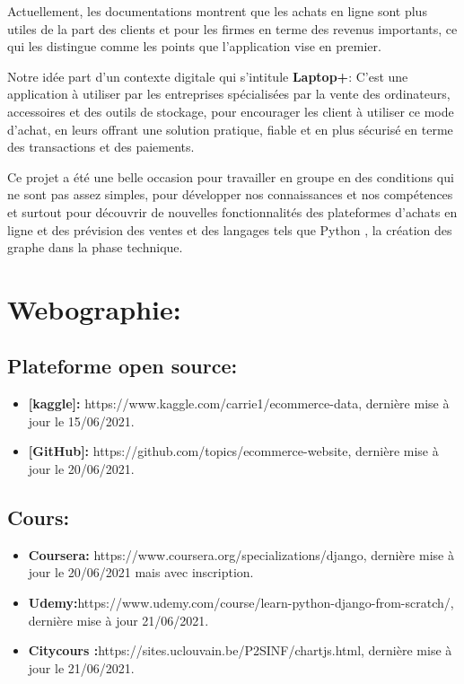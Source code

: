 \documentclass[a4paper]{report}
\begin{document}
\begin{doublespace}
\begin{doublespace}
\begin{doublespace}
\begin{doublespace}
\begin{doublespace}
\begin{doublespace}
                        Actuellement, les documentations montrent que les achats en ligne sont plus utiles de la part des clients et pour les firmes en terme des revenus importants, ce qui les distingue comme les points que  l'application vise en premier.

                        Notre idée part d'un contexte digitale qui s'intitule \textbf{Laptop+}: C’est une application à utiliser par les entreprises spécialisées par la vente des ordinateurs, accessoires et des outils de stockage, pour encourager les client à utiliser ce mode d'achat, en leurs offrant une solution pratique, fiable et en plus  sécurisé en terme des transactions et des paiements.

                        Ce projet a été une belle occasion pour travailler en groupe en des conditions qui ne sont pas assez simples, pour développer nos
                        connaissances et nos compétences et surtout pour découvrir de nouvelles fonctionnalités des plateformes d'achats en ligne et des prévision des ventes et des langages tels que Python , la création des graphe dans la phase technique.

                        \newpage
                        \section{Webographie:}
                        \subsection{Plateforme open source:}
                        \begin{itemize}
                            \item \textbf{[kaggle]:} https://www.kaggle.com/carrie1/ecommerce-data, dernière mise à jour le 15/06/2021.
                            \item \textbf{[GitHub]:} https://github.com/topics/ecommerce-website, dernière mise à jour le 20/06/2021.
                        \end{itemize}
                        \subsection{Cours:}
                        \begin{itemize}
                            \item \textbf{Coursera:} https://www.coursera.org/specializations/django, dernière mise à jour le 20/06/2021 mais avec inscription.
                            \item\textbf{Udemy:}https://www.udemy.com/course/learn-python-django-from-scratch/, dernière mise à jour 21/06/2021.
                            \item \textbf{Citycours :}https://sites.uclouvain.be/P2SINF/chartjs.html, dernière mise à jour le 21/06/2021.
                        \end{itemize}

\end{doublespace}
\end{doublespace}
\end{doublespace}
\end{doublespace}
\end{doublespace}
\end{doublespace}
\end{document}
